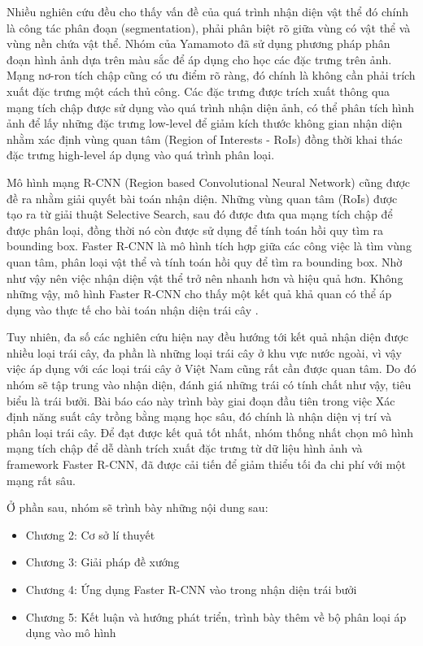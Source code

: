 Nhiều nghiên cứu đều cho thấy vấn đề của quá trình nhận diện vật thể đó chính là công tác phân đoạn (segmentation), phải phân biệt rõ giữa vùng có vật thể và vùng nền chứa vật thể. Nhóm của Yamamoto \cite{yamamoto2014plant} đã sử dụng phương pháp phân đoạn hình ảnh dựa trên màu sắc để áp dụng cho học các đặc trưng trên ảnh. Mạng nơ-ron tích chập cũng có ưu điểm rõ ràng, đó chính là không cần phải trích xuất đặc trưng một cách thủ công. Các đặc trưng được trích xuất thông qua mạng tích chập được sử dụng vào quá trình nhận diện ảnh, có thể phân tích hình ảnh để lấy những đặc trưng low-level để giảm kích thước không gian nhận diện nhằm xác định vùng quan tâm (Region of Interests - RoIs) đồng thời khai thác đặc trưng high-level áp dụng vào quá trình phân loại.

Mô hình mạng R-CNN (Region based Convolutional Neural Network) cũng được đề ra nhằm giải quyết bài toán nhận diện. Những vùng quan tâm (RoIs) được tạo ra từ giải thuật Selective Search, sau đó được đưa qua mạng tích chập để được phân loại, đồng thời nó còn được sử dụng để tính toán hồi quy tìm ra bounding box. Faster R-CNN là mô hình tích hợp giữa các công việc là tìm vùng quan tâm, phân loại vật thể và tính toán hồi quy để tìm ra bounding box. Nhờ như vậy nên việc nhận diện vật thể trở nên nhanh hơn và hiệu quả hơn. Không những vậy, mô hình Faster R-CNN cho thấy một kết quả khả quan có thể áp dụng vào thực tế cho bài toán nhận diện trái cây \cite{bargoti2017deep}.

Tuy nhiên, đa số các nghiên cứu hiện nay đều hướng tới kết quả nhận diện được nhiều loại trái cây, đa phần là những loại trái cây ở khu vực nước ngoài, vì vậy việc áp dụng với các loại trái cây ở Việt Nam cũng rất cần được quan tâm. Do đó nhóm sẽ tập trung vào nhận diện, đánh giá những trái có tính chất như vậy, tiêu biểu là trái bưởi. Bài báo cáo này trình bày giai đoạn đầu tiên trong việc Xác định năng suất cây trồng bằng mạng học sâu, đó chính là nhận diện vị trí và phân loại trái cây. Để đạt được kết quả tốt nhất, nhóm thống nhất chọn mô hình mạng tích chập để dễ dành trích xuất đặc trưng từ  dữ liệu hình ảnh và framework Faster R-CNN, đã được cải tiến để giảm thiểu tối đa chi phí với một mạng rất sâu.

Ở phần sau, nhóm sẽ trình bày những nội dung sau:
\begin{itemize}
	\item Chương 2: Cơ sở lí thuyết
	\item Chương 3: Giải pháp đề xướng
	\item Chương 4: Ứng dụng Faster R-CNN vào trong nhận diện trái bưởi
	\item Chương 5: Kết luận và hướng phát triển, trình bày thêm về bộ phân loại áp dụng vào mô hình
\end{itemize} 

